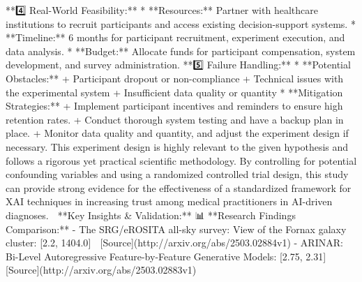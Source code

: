 \documentclass{article}%
\begin{document}
\newline%
**4️⃣ Real{-}World Feasibility:**\newline%
\newline%
* **Resources:** Partner with healthcare institutions to recruit participants and access existing decision{-}support systems.\newline%
* **Timeline:** 6 months for participant recruitment, experiment execution, and data analysis.\newline%
* **Budget:** Allocate funds for participant compensation, system development, and survey administration.\newline%
\newline%
**5️⃣ Failure Handling:**\newline%
\newline%
* **Potential Obstacles:**\newline%
	+ Participant dropout or non{-}compliance\newline%
	+ Technical issues with the experimental system\newline%
	+ Insufficient data quality or quantity\newline%
* **Mitigation Strategies:**\newline%
	+ Implement participant incentives and reminders to ensure high retention rates.\newline%
	+ Conduct thorough system testing and have a backup plan in place.\newline%
	+ Monitor data quality and quantity, and adjust the experiment design if necessary.\newline%
\newline%
This experiment design is highly relevant to the given hypothesis and follows a rigorous yet practical scientific methodology. By controlling for potential confounding variables and using a randomized controlled trial design, this study can provide strong evidence for the effectiveness of a standardized framework for XAI techniques in increasing trust among medical practitioners in AI{-}driven diagnoses.  \newline%
\newline%
🔹 **Key Insights \& Validation:**  \newline%
📊 **Research Findings Comparison:**\newline%
{-} The SRG/eROSITA all{-}sky survey: View of the Fornax galaxy cluster: {[}2.2, 1404.0{]} 🔗 {[}Source{]}(http://arxiv.org/abs/2503.02884v1)\newline%
{-} ARINAR: Bi{-}Level Autoregressive Feature{-}by{-}Feature Generative Models: {[}2.75, 2.31{]} 🔗 {[}Source{]}(http://arxiv.org/abs/2503.02883v1)\newline%
\end{document}
